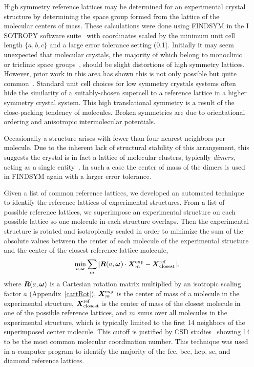 \documentclass[preprint]{revtex4}              %
\newcommand{\mb}[1]{\ensuremath{\mbox{\boldmath $ #1 $}}}
\newcommand{\mbss}[1]{\ensuremath{\mbox{\boldmath $ \scriptstyle #1 $}}}
\begin{document}
High symmetry reference lattices may be determined for an
experimental crystal structure by determining the space group formed
from the lattice of the molecular centers of mass. These
calculations were done using F{\small INDSYM} in the I{\small
SOTROPY} software suite~\cite{Stokes02b} with coordinates scaled by
the minimum unit cell length $\{a,b,c\}$ and a large error tolerance
setting (0.1). Initially it may seem unexpected that molecular
crystals, the majority of which belong to monoclinic or triclinic
space groups~\cite{Bassoul00}, should be slight distortions of high
symmetry lattices. However, prior work in this area has shown this
is not only possible but quite
common~\cite{Motherwell97,Reichling00}. Standard unit cell choices
for low symmetry crystals systems often hide the similarity of a
suitably-chosen supercell to a reference lattice in a higher
symmetry crystal system. This high translational symmetry is a
result of the close-packing tendency of molecules. Broken symmetries
are due to orientational ordering and anisotropic intermolecular
potentials.

Occasionally a structure arises with fewer than four nearest
neighbors per molecule.  Due to the inherent lack of structural
stability of this arrangement, this suggests the crystal is in fact
a lattice of molecular clusters, typically \emph{dimers}, acting as
a single entity~\cite{mcclurg}.  In such a case the center of mass of the dimers is
used in F{\small INDSYM} again with a larger error tolerance.

Given a list of common reference lattices, we developed an automated
technique to identify the reference lattices of experimental
structures. From a list of possible reference lattices, we
superimpose an experimental structure on each possible lattice so
one molecule in each structure overlaps. Then the experimental
structure is rotated and isotropically scaled in order to minimize
the sum of the absolute values between the center of each molecule
of the experimental structure and the center of the closest
reference lattice molecule,
\begin{equation}
\min_{a,\mbss{\omega}}\sum_m|\mb{R}(a,\mb{\omega})\cdot\mb{X}^{\mathrm{exp}}_m
 - \mb{X}^{\mathrm{ref}}_{\mathrm{closest}}|,
\end{equation}
where $\mb{R}(a,\mb{\omega})$ is a Cartesian rotation matrix
multiplied by an isotropic scaling factor $a$
(Appendix~\ref{cartRot}), $\mb{X}^{\mathrm{exp}}_m$ is the center of
mass of a molecule in the experimental structure,
$\mb{X}^{\mathrm{ref}}_{\mathrm{closest}}$ is the center of mass of
the closest molecule in one of the possible reference lattices, and
$m$ sums over all molecules in the experimental structure, which is
typically limited to the first 14 neighbors of the superimposed
center molecule.  This cutoff is justified by CSD
studies~\cite{Peresypkina00} showing 14 to be the most common
molecular coordination number. This technique was used in a computer
program to identify the majority of the fcc, bcc, hcp, sc, and
diamond reference lattices.
\end{document}
